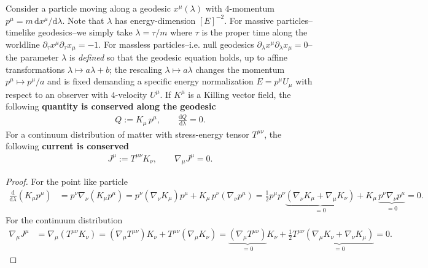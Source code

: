 \begin{mytheorem}
Consider a particle moving along a geodesic $x^\mu(\lambda)$ with $4$-momentum $p^\mu = m\,\mathrm{d}x^\mu/\mathrm{d}\lambda$.
Note that $\lambda$ has energy-dimension $[E]^{-2}$.
For massive particles--timelike geodesics--we simply take $\lambda=\tau/m$ where $\tau$ is the proper time along the worldline  $\partial_\tau x^\mu \partial_\tau x_\mu=-1$.
For massless particles--i.e. null geodesics $\partial_\lambda x^\mu \partial_\lambda x_\mu=0$--the parameter $\lambda$ is \emph{defined} so that the geodesic equation holds, up to affine transformations $\lambda \mapsto a \lambda + b$; the rescaling $\lambda \mapsto a \lambda$ changes the momentum $p^\mu \mapsto p^\mu/a$ and is fixed demanding a specific energy normalization $E=p^\mu U_\mu$ with respect to an observer with $4$-velocity $U^\mu$.
If $K^\mu$ is a Killing vector field, the following \textbf{quantity is conserved along the geodesic}
\begin{align}
    Q := K_\mu \,p^\mu, \qquad \frac{\mathrm{d}Q}{\mathrm{d}\lambda} = 0.
\end{align}
For a continuum distribution of matter with stress-energy tensor $T^{\mu\nu}$, the following \textbf{current is conserved}
\begin{align}
    J^\mu := T^{\mu\nu} K_\nu,\qquad \nabla_\mu J^\mu = 0.
\end{align}
\end{mytheorem}
\begin{proof}
For the point like particle
{\small
\begin{align}
    \frac{\mathrm{d}}{\mathrm{d}\lambda}(K_\mu p^\mu) &= p^\nu \nabla_\nu (K_\mu p^\mu) = p^\nu (\nabla_\nu K_\mu) p^\mu + K_\mu\, p^\nu (\nabla_\nu p^\mu)
     =\tfrac{1}{2}p^\mu p^\nu \underbrace{(\nabla_\nu K_\mu + \nabla_\mu K_\nu)}_{=0} + K_\mu\, \underbrace{p^\nu \nabla_\nu p^\mu}_{=0}= 0.
\end{align}
}
For the continuum distribution
{\small
\begin{align}
    \nabla_\mu J^\mu &= \nabla_\mu (T^{\mu\nu} K_\nu) = (\nabla_\mu T^{\mu\nu}) K_\nu + T^{\mu\nu} (\nabla_\mu K_\nu) = \underbrace{(\nabla_\mu T^{\mu\nu})}_{=0} K_\nu + \tfrac{1}{2} T^{\mu\nu} \underbrace{(\nabla_\mu K_\nu + \nabla_\nu K_\mu)}_{=0} = 0.
\end{align}
}
\end{proof}



